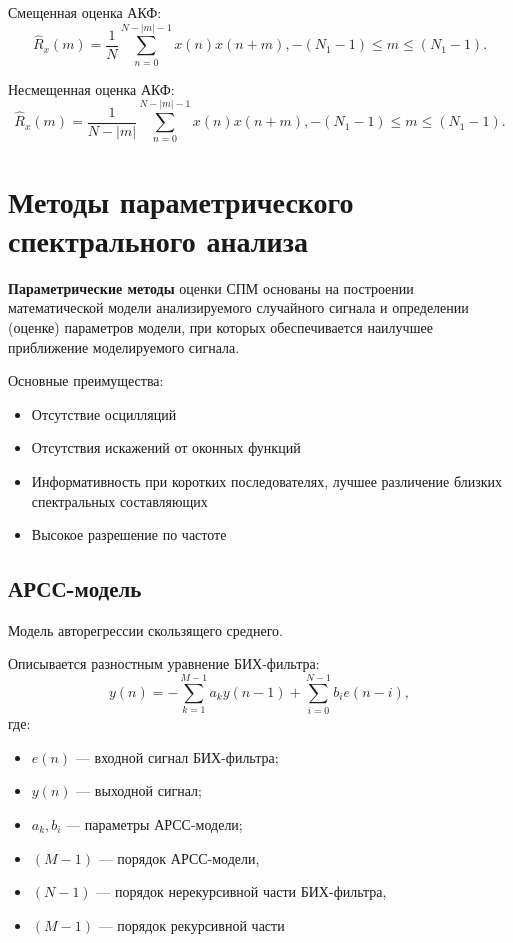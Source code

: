 \documentclass[a4paper, 14pt]{extarticle}
\begin{document}
Смещенная оценка АКФ:
\begin{equation}
    \hat{R}_x (m) = \frac{1}{N} \sum^{N-|m|-1}_{n=0} x(n)x(n+m), - (N_1 - 1) \leq m \leq (N_1 - 1).
\end{equation}

Несмещенная оценка АКФ:
\begin{equation}
    \hat{R}_x (m) = \frac{1}{N-|m|} \sum^{N-|m|-1}_{n=0} x(n)x(n+m), - (N_1 - 1) \leq m \leq (N_1 - 1).
\end{equation}

\section{Методы параметрического спектрального анализа}
\textbf{Параметрические методы} оценки СПМ основаны на построении математической модели анализируемого случайного сигнала и определении (оценке) параметров модели, при которых обеспечивается наилучшее приближение моделируемого сигнала.

Основные преимущества:
\begin{itemize}
    \item Отсутствие осцилляций
    \item Отсутствия искажений от оконных функций
    \item Информативность при коротких последователях, лучшее различение близких спектральных составляющих
    \item Высокое разрешение по частоте
\end{itemize}

\subsection{АРСС-модель}
Модель авторегрессии скользящего среднего.

Описывается разностным уравнение БИХ-фильтра:
\begin{equation}
    y(n) = - \sum^{M-1}_{k=1} a_k y(n-1) + \sum^{N-1}_{i=0} b_i e(n-i),
\end{equation}
где:
\begin{itemize}
    \item $e(n)$ --- входной сигнал БИХ-фильтра;
    \item $y(n)$ --- выходной сигнал;
    \item $a_k, b_i$ --- параметры АРСС-модели;
    \item $(M-1)$ --- порядок АРСС-модели,
    \item $(N-1)$ --- порядок нерекурсивной части БИХ-фильтра,
    \item $(M-1)$ --- порядок рекурсивной части
\end{itemize}
\end{document}

